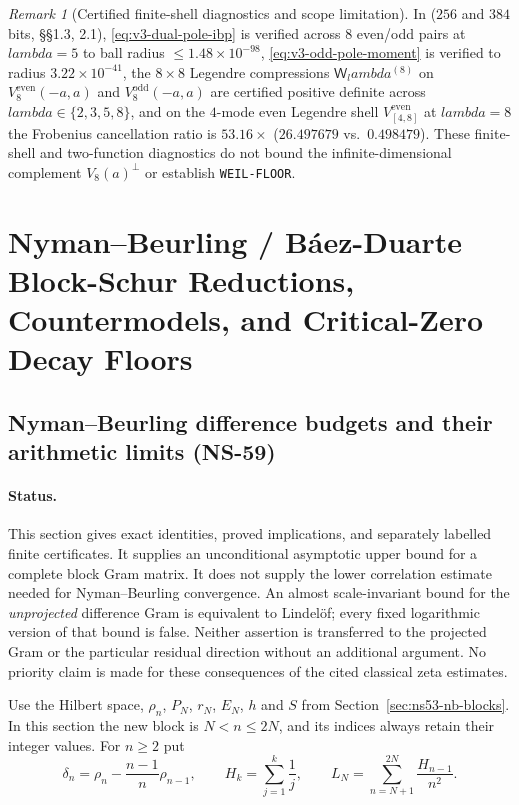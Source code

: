 \documentclass[11pt]{article}
\def\lambda{lambda}%
\theoremstyle{remark}
\newtheorem{remark}[theorem]{Remark}
\begin{document}
\begin{remark}[Certified finite-shell diagnostics and scope limitation]
In  ($256$ and $384$ bits,  \S\S1.3, 2.1), \eqref{eq:v3-dual-pole-ibp} is verified across $8$ even/odd pairs at $\lambda=5$ to ball radius $\le 1.48\times 10^{-98}$, \eqref{eq:v3-odd-pole-moment} is verified to radius $3.22\times 10^{-41}$, the $8\times 8$ Legendre compressions $\mathsf W_\lambda^{(8)}$ on $V_8^{\mathrm{even}}(-a,a)$ and $V_8^{\mathrm{odd}}(-a,a)$ are certified positive definite across $\lambda\in\{2,3,5,8\}$, and on the $4$-mode even Legendre shell $V_{[4,8]}^{\mathrm{even}}$ at $\lambda=8$ the Frobenius cancellation ratio is $53.16\times$ ($26.497679$ vs.\ $0.498479$). These finite-shell and two-function diagnostics do not bound the infinite-dimensional complement $V_8(a)^\perp$ or establish \texttt{WEIL-FLOOR}.
\end{remark}

\section{Nyman--Beurling / B\'aez-Duarte Block-Schur Reductions, Countermodels, and Critical-Zero Decay Floors}\label{sec:pillar4}
\subsection{Nyman--Beurling difference budgets and their arithmetic limits (NS-59)}
\label{sec:v158-nb-difference}

\paragraph{Status.}
This section gives exact identities, proved implications, and separately
labelled finite certificates. It supplies an unconditional asymptotic upper
bound for a complete block Gram matrix. It does not supply the lower
correlation estimate needed for Nyman--Beurling convergence. An almost
scale-invariant bound for the \emph{unprojected} difference Gram is equivalent
to Lindel\"of; every fixed logarithmic version of that bound is false.
Neither assertion is transferred to the projected Gram or the particular
residual direction without an additional argument. No priority claim is made
for these consequences of the cited classical zeta estimates.

Use the Hilbert space, $\rho_n$, $P_N$, $r_N$, $E_N$, $h$ and $S$ from
Section~\ref{sec:ns53-nb-blocks}. In this section the new block is
$N<n\leq 2N$, and its indices always retain their integer values.
For $n\geq2$ put
\begin{equation}
 \delta_n=\rho_n-\frac{n-1}{n}\rho_{n-1},\qquad
 H_k=\sum_{j=1}^k\frac1j,\qquad
 L_N=\sum_{n=N+1}^{2N}\frac{H_{n-1}}{n^2}.
 \label{eq:v158-difference-def}
\end{equation}
\end{document}

